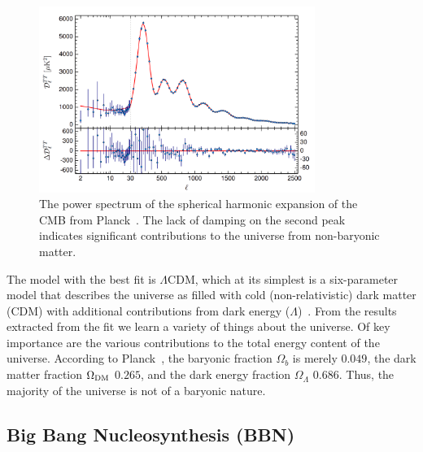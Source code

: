\begin{figure}[htb]
\centering
    \includegraphics[width=0.8\textwidth]{figures/dm/planck2015_cmb}
    \caption{The power spectrum of the spherical harmonic expansion of the CMB from Planck~\cite{Ade:2015xua}. The lack of damping on the second peak indicates significant contributions to the universe from non-baryonic matter.}\label{fig:cmb_ps}
\end{figure}

The model with the best fit is $\Lambda$CDM, which at its simplest is a six-parameter model that describes the universe as filled with cold (non-relativistic) dark matter (CDM) with additional contributions from dark energy ($\Lambda$)~\cite{Riess:1998cb}. From the results extracted from the fit we learn a variety of things about the universe. Of key importance are the various contributions to the total energy content of the universe. According to Planck~\cite{Ade:2015xua}, the baryonic fraction $\Omega_b$ is merely $0.049$, the dark matter fraction $\Omega_{\mathrm{DM}}$ $0.265$, and the dark energy fraction $\Omega_{\Lambda}$ $0.686$. Thus, the majority of the universe is not of a baryonic nature.

\subsection{Big Bang Nucleosynthesis (BBN)}

